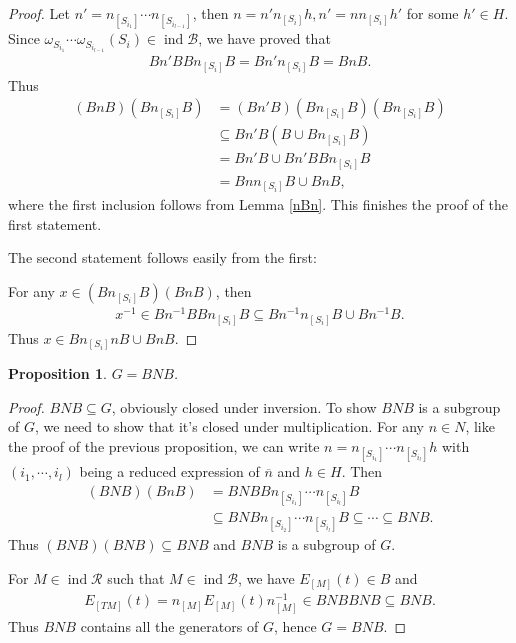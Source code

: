 \documentclass[12pt]{amsart}
\newtheorem{proposition}[theorem]{Proposition}
\begin{document}
\begin{proof}
    Let $n'=n_{[S_{i_1}]}\cdots n_{[S_{i_{l-1}}]} $, then $n=n'n_{[S_i]}h,n'=nn_{[S_i]}h'$ for some $h'\in H$.
    Since $\omega_{S_{i_1}}\cdots\omega_{S_{i_{l-1}}}(S_i)\in \operatorname{ind}\mathcal{B}$, we have proved that 
    \begin{align*}
        Bn'BBn_{[S_i]}B = Bn'n_{[S_i]}B = BnB.
    \end{align*}
    Thus
    \begin{align*}
        (BnB)(Bn_{[S_i]}B) &= (Bn'B)(Bn_{[S_i]}B)(Bn_{[S_i]}B) \\
        & \subseteq  Bn'B(B\cup Bn_{[S_i]}B)\\
        &= Bn'B \cup Bn'BBn_{[S_i]}B \\
        & = Bnn_{[S_i]}B \cup BnB,
    \end{align*}
    where the first inclusion follows from Lemma \ref{nBn}. 
    This finishes the proof of the first statement.

    The second statement follows easily from the first: 

    For any $ x \in (Bn_{[S_i]}B)(BnB)$, then 
    \begin{align*}
        x^{-1} \in Bn^{-1}BBn_{[S_i]}B \subseteq  Bn^{-1}n_{[S_i]}B \cup Bn^{-1}B.
    \end{align*}
    Thus $x\in Bn_{[S_i]}nB \cup BnB$.
\end{proof}

\begin{proposition}\label{GBNB}
    $G=BNB$.
\end{proposition}

\begin{proof}
    $BNB \subseteq  G$, obviously closed under inversion. 
    To show $BNB$ is a subgroup of $G$, we need to show that it's closed under multiplication.
    For any $n \in N$, like the proof of the previous proposition, we can write $n=n_{[S_{i_1}]}\cdots n_{[S_{i_l}]}h$ with $(i_1,\cdots,i_l)$ being a reduced expression of $\overline{n}$ and $h\in H$. 
    Then
    \begin{align*}
        (BNB)(BnB) &= BNBBn_{[S_{i_1}]}\cdots n_{[S_{i_l}]}B \\
            &\subseteq  BNBn_{[S_{i_2}]}\cdots n_{[S_{i_l}]}B \subseteq  \cdots \subseteq  BNB.
    \end{align*}
    Thus $(BNB)(BNB)\subseteq  BNB$ and $BNB$ is a subgroup of $G$.

    For $M \in \operatorname{ind}\mathcal{R}$ such that $M \in \operatorname{ind}\mathcal{B}$, we have $E_{[M]}(t) \in B$ and 
    \begin{align*}
        E_{[TM]}(t) = n_{[M]}E_{[M]}(t)n_{[M]}^{-1} \in BNBBNB \subseteq  BNB.
    \end{align*}
    Thus $BNB$ contains all the generators of $G$, hence $G=BNB$.
\end{proof}
\end{document}
